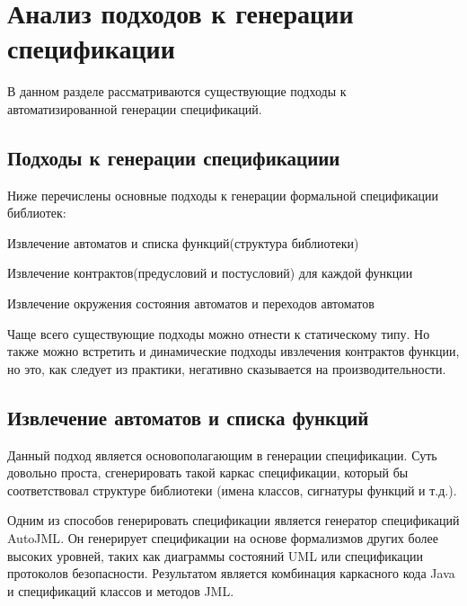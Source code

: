 \chapter{Анализ подходов к генерации спецификации}

В данном разделе рассматриваются существующие подходы к автоматизированной генерации спецификаций.

\section{Подходы к генерации спецификациии}

Ниже перечислены основные подходы к генерации формальной спецификации библиотек:
%
\begin{itemize*}
\item Извлечение автоматов и списка функций(структура библиотеки)
\item Извлечение контрактов(предусловий и постусловий) для каждой функции
\item Извлечение окружения состояния автоматов и переходов автоматов
\end{itemize*}
%

Чаще всего существующие подходы можно отнести к статическому типу. Но также можно встретить и динамические подходы ивзлечения контрактов функции, но это, как следует из практики, негативно сказывается на производительности.

\section{Извлечение автоматов и списка функций}

Данный подход является основополагающим в генерации спецификации. Суть довольно проста, сгенерировать такой каркас спецификации, который бы соответствовал структуре библиотеки (имена классов, сигнатуры функций и т.д.).

Одним из способов генерировать спецификации является генератор спецификаций AutoJML\cite{autoJML_paper}\cite{autoJML}.
Он генерирует спецификации на основе формализмов других более высоких уровней, таких как диаграммы состояний UML или спецификации протоколов безопасности. Результатом является комбинация каркасного кода Java и спецификаций классов и методов JML.

